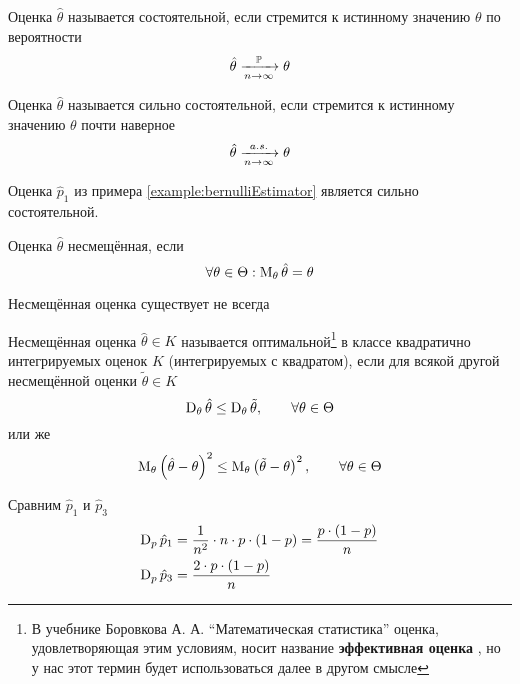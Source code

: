 \begin{definition}
  Оценка $\hat{\theta}$ называется состоятельной,
  если стремится к истинному значению $\theta$ по вероятности
  $$\hat{\theta}\xrightarrow[n\to\infty]{\mathbb{P}}\theta$$
\end{definition}
\begin{definition}
  Оценка $\hat{\theta}$ называется сильно состоятельной,
  если стремится к истинному значению $\theta$ почти наверное
  $$\hat{\theta}\xrightarrow[n\to\infty]{a.s.}\theta$$
\end{definition}
\begin{example}
  Оценка $\hat{p}_1$ из примера \ref{example:bernulliEstimator}
  является сильно состоятельной.
\end{example}
\begin{definition}
  \label{def:estimatorBias}
  Оценка $\hat{\theta}$ несмещённая, если
  $$\forall\theta\in\Theta: \operatorname{M}_{\theta} \hat{\theta}=\theta$$
\end{definition}
\begin{remark}Несмещённая оценка существует не всегда
\end{remark}
\begin{definition}Несмещённая оценка $\hat{\theta}\in K$
называется оптимальной\footnote{В учебнике Боровкова А. А.
``Математическая статистика'' оценка, удовлетворяющая этим условиям,
носит название \textbf{эффективная оценка} \cite[стр.~130]{BorovkovMS},
но у нас этот термин будет использоваться далее в другом смысле}
в классе квадратично интегрируемых оценок $K$ (интегрируемых с квадратом),
если для всякой другой несмещённой оценки $\tilde{\theta}\in K$
$$\operatorname{D}_{\theta} \hat{\theta}\le\operatorname{D}_{\theta} \tilde{\theta},
\qquad \forall\theta\in\Theta$$
или же
$$\operatorname{M}_{\theta} \left(\hat{\theta}-\theta\right)^2
\le\operatorname{M}_{\theta} \left(\tilde{\theta}-\theta\right)^2,
\qquad \forall\theta\in\Theta$$
\end{definition}

\begin{example}Сравним $\hat{p}_1$ и $\hat{p}_3$
  \begin{align*}
  \operatorname{D}_{p} \hat{p}_1
    &=\frac{1}{n^2}\cdot n\cdot p\cdot\left(1-p\right)
    =\frac{p\cdot\left(1-p\right)}{n}\\
  \operatorname{D}_{p} \hat{p}_3
    &=\frac{2\cdot p\cdot\left(1-p\right)}{n}
  \end{align*}
\end{example}
